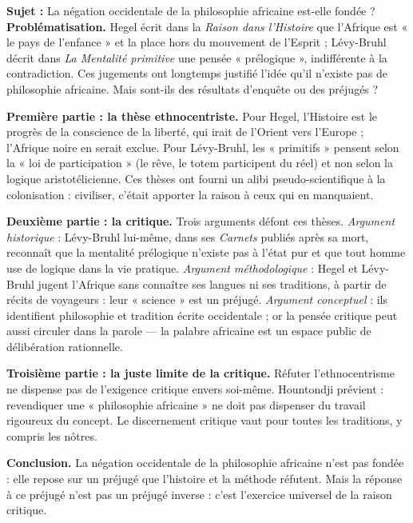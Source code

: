 \documentclass[11pt]{article}
\begin{document}
\begin{exoresolu}
\textbf{Sujet :} La négation occidentale de la philosophie africaine est-elle fondée ?
\tcblower
\textbf{Problématisation.} Hegel écrit dans la \emph{Raison dans l'Histoire} que l'Afrique est « le pays de l'enfance » et la place hors du mouvement de l'Esprit ; Lévy-Bruhl décrit dans \emph{La Mentalité primitive} une pensée « prélogique », indifférente à la contradiction. Ces jugements ont longtemps justifié l'idée qu'il n'existe pas de philosophie africaine. Mais sont-ils des résultats d'enquête ou des préjugés ?

\textbf{Première partie : la thèse ethnocentriste.} Pour Hegel, l'Histoire est le progrès de la conscience de la liberté, qui irait de l'Orient vers l'Europe ; l'Afrique noire en serait exclue. Pour Lévy-Bruhl, les « primitifs » pensent selon la « loi de participation » (le rêve, le totem participent du réel) et non selon la logique aristotélicienne. Ces thèses ont fourni un alibi pseudo-scientifique à la colonisation : civiliser, c'était apporter la raison à ceux qui en manquaient.

\textbf{Deuxième partie : la critique.} Trois arguments défont ces thèses. \emph{Argument historique} : Lévy-Bruhl lui-même, dans ses \emph{Carnets} publiés après sa mort, reconnaît que la mentalité prélogique n'existe pas à l'état pur et que tout homme use de logique dans la vie pratique. \emph{Argument méthodologique} : Hegel et Lévy-Bruhl jugent l'Afrique sans connaître ses langues ni ses traditions, à partir de récits de voyageurs : leur « science » est un préjugé. \emph{Argument conceptuel} : ils identifient philosophie et tradition écrite occidentale ; or la pensée critique peut aussi circuler dans la parole — la palabre africaine est un espace public de délibération rationnelle.

\textbf{Troisième partie : la juste limite de la critique.} Réfuter l'ethnocentrisme ne dispense pas de l'exigence critique envers soi-même. Hountondji prévient : revendiquer une « philosophie africaine » ne doit pas dispenser du travail rigoureux du concept. Le discernement critique vaut pour toutes les traditions, y compris les nôtres.

\textbf{Conclusion.} La négation occidentale de la philosophie africaine n'est pas fondée : elle repose sur un préjugé que l'histoire et la méthode réfutent. Mais la réponse à ce préjugé n'est pas un préjugé inverse : c'est l'exercice universel de la raison critique.
\end{exoresolu}
\end{document}
